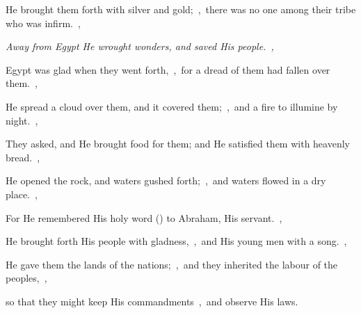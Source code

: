 \documentclass[12pt,twoside,a5paper]{article}
\begin{document}
\begin{normalparskip}
  He brought them forth with silver and gold;~\sep\ there was no one among their tribe who was infirm.~\sep

  \emph{Away from Egypt He wrought wonders, and saved His people.~\sep}

  Egypt was glad when they went forth,~\sep\ for a dread of them had fallen over them.~\sep

  He spread a cloud over them, and it covered them;~\sep\ and a fire to illumine by night.~\sep

  They asked, and He brought food for them; and He satisfied them with heavenly bread.~\sep

  He opened the rock, and waters gushed forth;~\sep\ and waters flowed in a dry place.~\sep

  For He remembered His holy word () to Abraham, His servant.~\sep

  He brought forth His people with gladness,~\sep\ and His young men with a song.~\sep

  He gave them the lands of the nations;~\sep\ and they inherited the labour of the peoples,~\sep

  so that they might keep His commandments~\sep\ and observe His laws.
\end{normalparskip}





\end{document}
